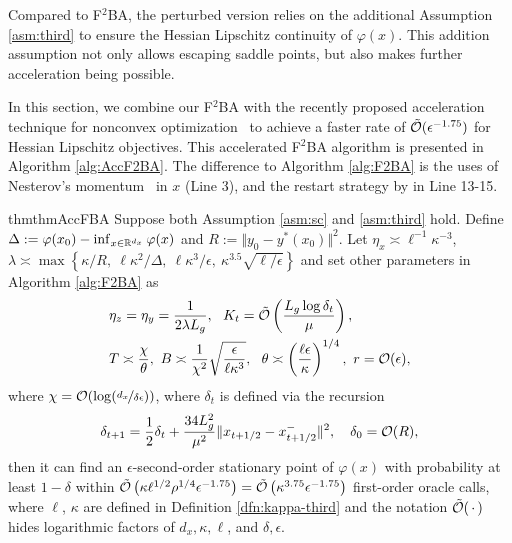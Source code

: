 \documentclass[twoside,11pt]{article}
\begin{document}
Compared to F${}^2$BA, the perturbed version relies on the additional Assumption \ref{asm:third} to ensure the Hessian Lipschitz continuity of $\varphi(x)$. This addition assumption not only allows escaping saddle points, but also makes further acceleration being possible.

In this section, we combine our F${}^2$BA with the recently proposed acceleration technique for nonconvex optimization~\citep{li2023restarted} to achieve a faster rate of $\tilde {{\mathcal{O}}}(\epsilon^{-1.75})$ for Hessian Lipschitz objectives. This accelerated F${}^2$BA algorithm is presented in Algorithm \ref{alg:AccF2BA}. The difference to Algorithm \ref{alg:F2BA} is the uses of Nesterov's momentum~\citep{nesterov1983method} in $x$ (Line 3), and the restart strategy by \citep{li2023restarted} in Line 13-15.

\begin{restatable}{thm}{thmAccFBA}\label{thm:AccF2BA}
Suppose both Assumption \ref{asm:sc} and \ref{asm:third} hold.
Define $\Delta:=\varphi(x_0) - \inf_{x \in {\mathbb{R}}^{d_x}} \varphi(x)$ and $R := \Vert y_0 - y^*(x_0) \Vert^2 $.
Let $\eta_x \asymp \ell^{-1} \kappa^{-3} $, $\lambda \asymp \max\left\{ \kappa/R,~\ell \kappa^2/ \Delta, ~ \ell \kappa^3 / \epsilon,~\kappa^{3.5} \sqrt{\ell / \epsilon} \right\} $ and set other parameters 
in Algorithm \ref{alg:F2BA} as 
\begin{align*}
    & \eta_z = \eta_y = \frac{1}{2 \lambda L_g},~~ K_t = \tilde {{\mathcal{O}}}\left(\frac{L_g  \log \delta_t}{\mu}   \right), \\
    &  T \asymp \frac{\chi}{\theta},~  B \asymp \frac{1}{\chi^2} \sqrt{\frac{\epsilon}{\ell \kappa^3}}, ~~ \theta \asymp \left( \frac{\ell \epsilon}{\kappa} \right)^{1/4}, ~ r = {\mathcal{O}}(\epsilon),
\end{align*}
where $\chi = {\mathcal{O}}(\log (\nicefrac{d_x}{\delta \epsilon}))$, 
where $\delta_t$ is defined via the recursion
\begin{align} \label{eq:delta-t-acc}
    \delta_{t+1} = \frac{1}{2}\delta_t + \frac{34 L_g^2}{\mu^2}  \Vert x_{t+1/2} - x_{t+1/2}^- \Vert^2, \quad \delta_0 = {\mathcal{O}}(R),
\end{align}
then 
it can find an $\epsilon$-second-order stationary point of $\varphi(x)$ with probability at least $1-\delta$
within $ \tilde {{\mathcal{O}}}\left( \kappa \ell^{1/2} \rho^{1/4} \epsilon^{-1.75}  \right) = \tilde {{\mathcal{O}}} \left( \kappa^{3.75} \epsilon^{-1.75} \right)  $ first-order oracle calls, where $\ell$,  $\kappa$ are defined in Definition \ref{dfn:kappa-third} and the notation $\tilde {{\mathcal{O}}}(\,\cdot\,)$ hides logarithmic factors of $d_x,\kappa,\ell$, and $\delta,\epsilon$.
\end{restatable}
\end{document}
